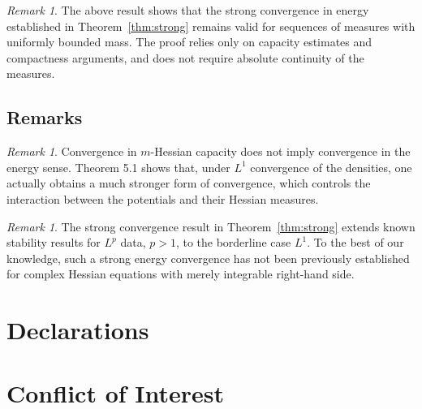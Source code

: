 \documentclass[11pt,reqno]{amsart}
\theoremstyle{definition}
\theoremstyle{remark}
\newtheorem{remark}[theorem]{Remark}
\begin{document}
\begin{remark}
	The above result shows that the strong convergence in energy established
	in Theorem~\ref{thm:strong} remains valid for sequences of measures with
	uniformly bounded mass. The proof relies only on capacity estimates and
	compactness arguments, and does not require absolute continuity of the measures.
\end{remark}
\subsection{Remarks}
\begin{remark}
	Convergence in $m$-Hessian capacity does not imply convergence
	in the energy sense.
	Theorem 5.1 shows that, under $L^1$ convergence of the densities,
	one actually obtains a much stronger form of convergence,
	which controls the interaction between the potentials and their
	Hessian measures.
\end{remark}
\begin{remark}
	The strong convergence result in Theorem~\ref{thm:strong} extends known stability results for $L^p$ data, $p>1$, to the borderline case $L^1$.
	To the best of our knowledge, such a strong energy convergence has not been previously established for complex Hessian equations with merely integrable right-hand side.
\end{remark}	
	
	
	
	
	
	
	

	
	
	\section*{Declarations}
	\section*{Conflict of Interest}
	
\end{document}
